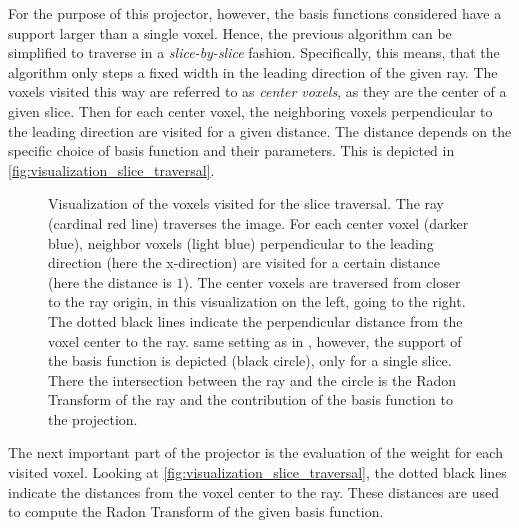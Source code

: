 For the purpose of this projector, however, the basis functions considered have a support larger
than a single voxel. Hence, the previous algorithm can be simplified to traverse in a
\textit{slice-by-slice} fashion. Specifically, this means, that the algorithm only steps a fixed
width in the leading direction of the given ray. The voxels visited this way are referred to as
\textit{center voxels}, as they are the center of a given slice. Then for each center voxel, the
neighboring voxels perpendicular to the leading direction are visited for a given distance. The
distance depends on the specific choice of basis function and their parameters. This is depicted in
\autoref{fig:visualization_slice_traversal}.

\begin{figure}[h]
	\centering
	\caption{ Visualization of the voxels visited
		for the slice traversal. The ray (cardinal red line) traverses the image. For each
		center voxel (darker blue), neighbor voxels (light blue) perpendicular to the
		leading direction (here the x-direction) are visited for a certain distance (here
		the distance is \(1\)). The center voxels are traversed from closer to the ray
		origin, in this visualization on the left, going to the right. The dotted black
		lines indicate the perpendicular distance from the voxel center to the ray.
		 same setting as in
		, however, the support of the basis function is
		depicted (black circle), only for a single slice. There the intersection between the
		ray and the circle is the Radon Transform of the ray and the contribution of the
		basis function to the projection.
	}\label{fig:visualization_slice_traversal}
\end{figure}

The next important part of the projector is the evaluation of the weight for each visited voxel.
Looking at \autoref{fig:visualization_slice_traversal}, the dotted black lines indicate the
distances from the voxel center to the ray. These distances are used to compute the Radon Transform
of the given basis function.

